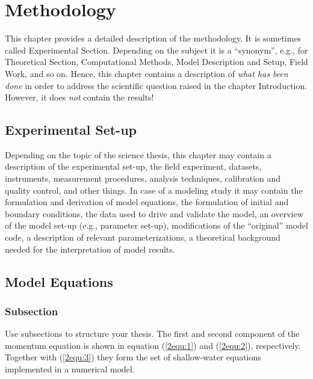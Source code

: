 \chapter{Methodology}\label{chap2}
\thispagestyle{plain}

This chapter provides a detailed description of the methodology. It is
sometimes called Experimental Section. Depending on the subject it is a
``synonym'', e.g., for Theoretical Section, Computational Methods, Model
Description and Setup, Field Work, and so on. Hence, this chapter contains a
description of \emph{what has been done} in order to address the scientific
question raised in the chapter Introduction. However, it does \emph{not} contain
the results! 


\section{Experimental Set-up}\label{2sec:1}
Depending on the topic of the science thesis, this chapter may contain a
description of the experimental set-up, the field experiment,
datasets, instruments, measurement procedures, analysis techniques, calibration
and quality control, and other things. In case of a modeling study it may
contain the formulation and derivation of model equations, the formulation of
initial and boundary conditions, the data used to drive and validate the model,
an overview of the model set-up (e.g., parameter set-up), modifications of the
``original'' model code, a description of relevant parameterizations,
a theoretical background needed for the interpretation of model results.


\section{Model Equations}\label{2sec:2}

\subsection{Subsection}
Use subsections to structure your thesis. The first and second component of the
momentum equation is shown in equation (\ref{2equ:1}) and (\ref{2equ:2}),
respectively. Together with (\ref{2equ:3}) they form the set of shallow-water
equations implemented in a numerical model.

